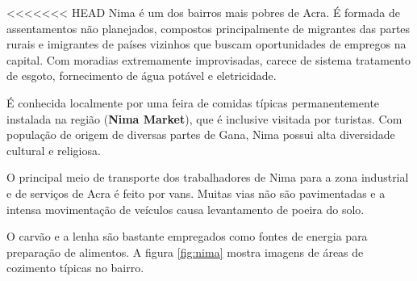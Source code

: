 <<<<<<< HEAD
Nima é um dos bairros mais pobres de Acra. É formada de assentamentos não 
planejados, compostos principalmente de migrantes das partes rurais e 
imigrantes de países vizinhos que buscam oportunidades de empregos na capital. 
Com moradias extremamente improvisadas, carece de sistema tratamento de esgoto, 
fornecimento de água potável e eletricidade. 

É conhecida localmente por uma feira de comidas típicas permanentemente 
instalada na região (\textbf{Nima Market}), que é inclusive visitada por turistas.
Com população de origem de diversas partes de Gana, Nima possui 
alta diversidade cultural e religiosa.

O principal meio de transporte dos trabalhadores de Nima para a zona industrial
e de serviços de Acra é feito por vans. 
Muitas vias não são pavimentadas e a intensa movimentação de veículos causa 
levantamento de poeira do solo.

O carvão e a lenha são bastante empregados como fontes de energia para preparação de 
alimentos. A figura \ref{fig:nima} mostra imagens de áreas de cozimento típicas no bairro.






